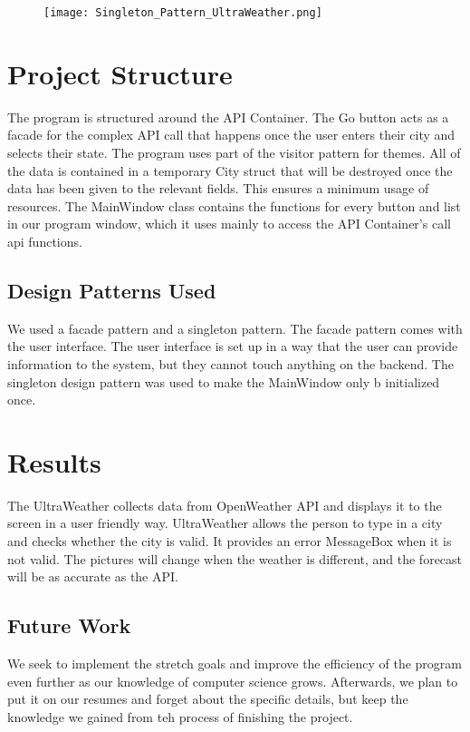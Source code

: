 \documentclass[10pt,conference,onecolumn,compsoc]{IEEEtran}
\begin{document}
\begin{figure}[ht!]
\texttt{[image: Singleton\_Pattern\_UltraWeather.png]}
\end{figure}

\section{Project Structure}
The program is structured around the API Container. The Go button acts as a facade for the complex API call that happens once the user enters their city and selects their state. The program uses part of the visitor pattern for themes. All of the data is contained in a temporary City struct that will be destroyed once the data has been given to the relevant fields. This ensures a minimum usage of resources.
The MainWindow class contains the functions for every button and list in our program window, which it uses mainly to access the API Container's call api functions.




\subsection{Design Patterns Used}
We used a facade pattern and a singleton pattern. The facade pattern comes with the user interface. The user interface is set up in a way that the user can provide information to the system, but they cannot touch anything on the backend. The singleton design pattern was used to make the MainWindow only b initialized once.

\section{Results}
The UltraWeather collects data from OpenWeather API and displays it to the screen in a user friendly way. UltraWeather allows the person to type in a city and checks whether the city is valid. It provides an error MessageBox when it is not valid. The pictures will change when the weather is different, and the forecast will be as accurate as the API.

\subsection{Future Work}
We seek to implement the stretch goals and improve the efficiency of the program even further as our knowledge of computer science grows. Afterwards, we plan to put it on our resumes and forget about the specific details, but keep the knowledge we gained from teh process of finishing the project.
\end{document}

